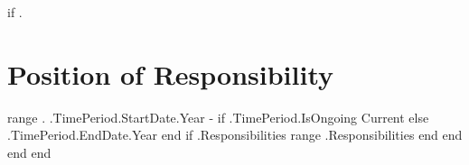 {{if .}}
\section{Position of Responsibility}
\vspace{-5pt}
    \resumeSubHeadingListStart
    {{range .}}
         { {{.TimePeriod.StartDate.Year}} - {{if .TimePeriod.IsOngoing}} Current {{else}} {{.TimePeriod.EndDate.Year}} {{end}} }
            {{if .Responsibilities}}
            \vspace{-16pt}
            \resumeItemListStart
                {{range .Responsibilities}} 
                {{end}}
            \resumeItemListEnd
            {{end}}
    {{end}}
    \resumeSubHeadingListEnd
    \vspace{-16pt}
{{end}}